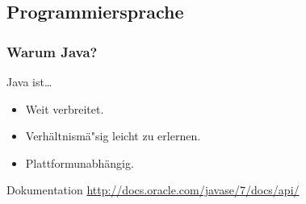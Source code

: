 \subsection{Programmiersprache}
\begin{frame}
\frametitle{Warum Java?}
	\begin{block}{Java ist\ldots}
 		\begin{itemize}
		  \item Weit verbreitet.
		  \item Verh\"altnism\"a"sig leicht zu erlernen.
		  \item Plattformunabh\"angig.
		\end{itemize} 
	\end{block}
	\begin{exampleblock}{Dokumentation}
		\url{http://docs.oracle.com/javase/7/docs/api/}
	\end{exampleblock}
\end{frame}
 
